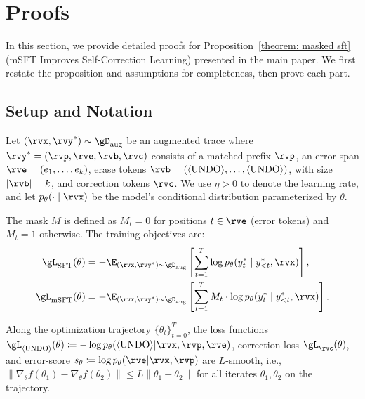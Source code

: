 \section{Proofs}\label{app: proofs}

In this section, we provide detailed proofs for Proposition~\ref{theorem: masked sft} (mSFT Improves Self-Correction Learning) presented in the main paper. 
We first restate the proposition and assumptions for completeness, then prove each part.

\subsection{Setup and Notation}

Let $(\rvx, \rvy^*) \sim \gD_\text{aug}$ be an augmented trace where $\rvy^* = (\rvp, \rve, \rvb, \rvc)$ consists of a matched prefix $\rvp$, an error span $\rve =(e_1, \ldots, e_k) $, erase tokens $\rvb =  (\bk, \ldots, \bk)$, with size $|\rvb| = k$, and correction tokens $\rvc$.
We use $\eta > 0$ to denote the learning rate, and let $p_\theta(\cdot \mid \rvx)$ be the model's conditional distribution parameterized by $\theta$.

The mask $M$ is defined as $M_t = 0$ for positions $t \in \rve$ (error tokens) and $M_t = 1$ otherwise. The training objectives are:
\begin{align}
    \gL_\text{SFT}(\theta) &= -\E_{(\rvx, \rvy^*) \sim \gD_\text{aug}}\left[\sum_{t=1}^T \log p_\theta(y_t^* \mid y_{<t}^*, \rvx)\right], \\
    \gL_\text{mSFT}(\theta) &= -\E_{(\rvx, \rvy^*) \sim \gD_\text{aug}}\left[\sum_{t=1}^T M_t \cdot \log p_\theta(y_t^* \mid y_{<t}^*, \rvx)\right].
\end{align}


\begin{assumption}[Smoothness]\label{assm:smoothness}
Along the optimization trajectory $\{\theta_t\}_{t=0}^T$, the loss functions $\gL_{\bk}(\theta) \coloneqq -\log p_\theta(\bk | \rvx, \rvp, \rve)$, correction loss $\gL_\rvc(\theta)$, and error-score $s_\theta \coloneqq \log p_\theta(\rve | \rvx, \rvp)$ are $L$-smooth, i.e., $\|\nabla_\theta f(\theta_1) - \nabla_\theta f(\theta_2)\| \leq L\|\theta_1 - \theta_2\|$ for all iterates $\theta_1, \theta_2$ on the trajectory.
\end{assumption}

